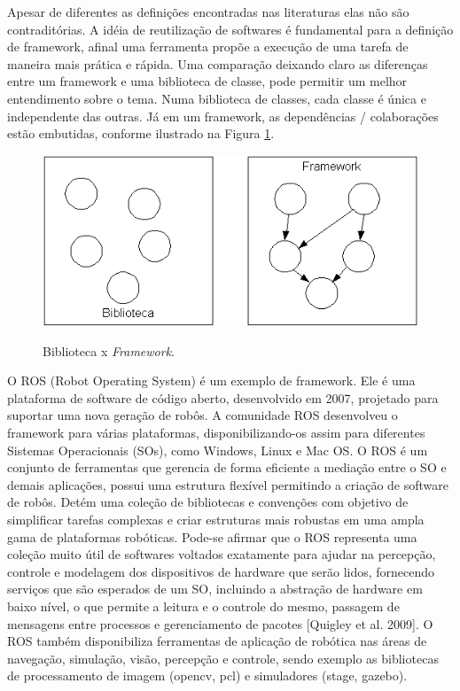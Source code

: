 Apesar de diferentes as definições encontradas nas literaturas elas não são contraditórias. A idéia de reutilização de softwares é fundamental para a definição de framework, afinal uma ferramenta propõe a execução de uma tarefa de maneira mais prática e rápida. Uma comparação deixando claro as diferenças entre um framework e uma biblioteca de classe, pode permitir um melhor entendimento sobre o tema. Numa biblioteca de classes, cada classe é única e independente das outras. Já em um framework, as dependências / colaborações estão embutidas, conforme ilustrado na Figura \ref{fig:biblioteca_vs_framework}.

\begin{figure}[H]
	\centering
	\caption{Biblioteca x \textit{Framework}.}
	\includegraphics[width=1\textwidth]
	{Figures/biblioteca_vs_framework}
	\label{fig:biblioteca_vs_framework}
\end{figure}

O ROS (Robot Operating System) é um exemplo de framework. Ele é uma plataforma de software de código aberto, desenvolvido em 2007, projetado para suportar uma nova geração de robôs. A comunidade ROS desenvolveu o framework para várias plataformas, disponibilizando-os assim para diferentes Sistemas Operacionais (SOs), como Windows, Linux e Mac OS. O ROS é um conjunto de ferramentas que gerencia de forma eficiente  a mediação entre o SO e demais aplicações, possui uma estrutura flexível permitindo a criação de software de robôs. Detém uma coleção de bibliotecas e convenções com objetivo de simplificar tarefas complexas e criar estruturas mais robustas em uma ampla gama de plataformas robóticas. Pode-se afirmar que o ROS representa uma coleção muito útil de softwares voltados exatamente para ajudar na percepção, controle e modelagem dos dispositivos de hardware que serão lidos, fornecendo serviços que são esperados de um SO, incluindo a abstração de hardware em baixo nível, o que permite a leitura e o controle do mesmo, passagem de mensagens entre processos e gerenciamento de pacotes [Quigley et al. 2009]. O ROS também disponibiliza ferramentas de aplicação de robótica nas áreas de navegação, simulação, visão, percepção e controle, sendo exemplo as bibliotecas de processamento de imagem (opencv, pcl) e simuladores (stage, gazebo).


